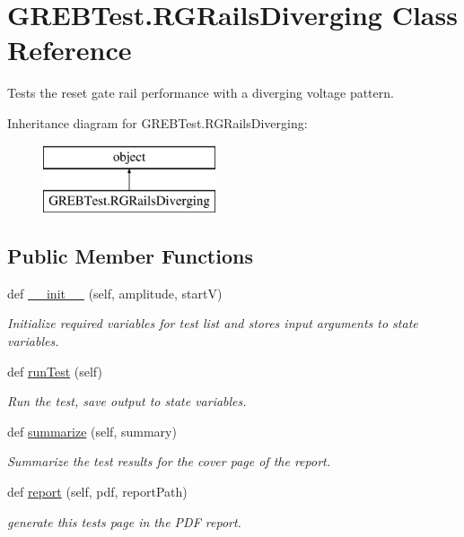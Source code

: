 \hypertarget{class_g_r_e_b_test_1_1_r_g_rails_diverging}{}\section{G\+R\+E\+B\+Test.\+R\+G\+Rails\+Diverging Class Reference}
\label{class_g_r_e_b_test_1_1_r_g_rails_diverging}


Tests the reset gate rail performance with a diverging voltage pattern.  


Inheritance diagram for G\+R\+E\+B\+Test.\+R\+G\+Rails\+Diverging\+:\begin{figure}[H]
\begin{center}
\leavevmode
\includegraphics[height=2.000000cm]{class_g_r_e_b_test_1_1_r_g_rails_diverging}
\end{center}
\end{figure}
\subsection*{Public Member Functions}
\begin{DoxyCompactItemize}
\item 
def \hyperlink{class_g_r_e_b_test_1_1_r_g_rails_diverging_a80bca507ab4c2c3d5e1821f7e81a34e8}{\+\_\+\+\_\+init\+\_\+\+\_\+} (self, amplitude, startV)
\begin{DoxyCompactList}\small\item\em Initialize required variables for test list and stores input arguments to state variables. \end{DoxyCompactList}\item 
def \hyperlink{class_g_r_e_b_test_1_1_r_g_rails_diverging_a34c944c556559bdf05bd5350833c1db6}{run\+Test} (self)
\begin{DoxyCompactList}\small\item\em Run the test, save output to state variables. \end{DoxyCompactList}\item 
def \hyperlink{class_g_r_e_b_test_1_1_r_g_rails_diverging_a262ac574eef44165ea30130e8145c683}{summarize} (self, summary)
\begin{DoxyCompactList}\small\item\em Summarize the test results for the cover page of the report. \end{DoxyCompactList}\item 
def \hyperlink{class_g_r_e_b_test_1_1_r_g_rails_diverging_a99618ce71adbb3a4d75b221941d629af}{report} (self, pdf, report\+Path)
\begin{DoxyCompactList}\small\item\em generate this test\textquotesingle{}s page in the P\+DF report. \end{DoxyCompactList}\end{DoxyCompactItemize}


